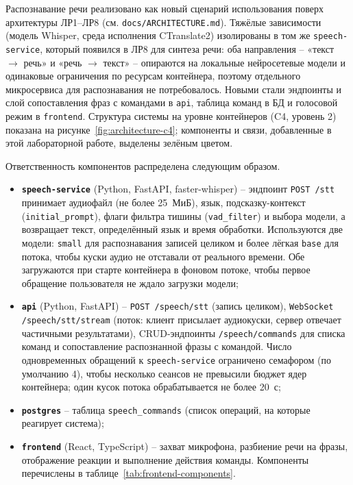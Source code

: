 

Распознавание речи реализовано как новый сценарий использования поверх
архитектуры ЛР1--ЛР8 (см. \texttt{docs/ARCHITECTURE.md}). Тяжёлые
зависимости (модель Whisper, среда исполнения CTranslate2) изолированы
в том же \texttt{speech-service}, который появился в ЛР8 для синтеза
речи: оба направления -- «текст $\to$ речь» и «речь $\to$ текст» --
опираются на локальные нейросетевые модели и одинаковые ограничения по
ресурсам контейнера, поэтому отдельного микросервиса для распознавания
не потребовалось. Новыми стали эндпоинты и слой сопоставления фраз с
командами в \texttt{api}, таблица команд в БД и голосовой режим в
\texttt{frontend}. Структура системы на уровне контейнеров (C4,
уровень 2) показана на рисунке~\ref{fig:architecture-c4}; компоненты и
связи, добавленные в этой лабораторной работе, выделены зелёным цветом.


Ответственность компонентов распределена следующим образом.
\begin{itemize}
  \item \textbf{\texttt{speech-service}} (Python, FastAPI,
  faster-whisper) -- эндпоинт \texttt{POST /stt} принимает аудиофайл
  (не более 25~МиБ), язык, подсказку-контекст (\texttt{initial\_prompt}),
  флаги фильтра тишины (\texttt{vad\_filter}) и выбора модели, а
  возвращает текст, определённый язык и время обработки. Используются
  две модели: \texttt{small} для распознавания записей целиком и более
  лёгкая \texttt{base} для потока, чтобы куски аудио не отставали от
  реального времени. Обе загружаются при старте контейнера в фоновом
  потоке, чтобы первое обращение пользователя не ждало загрузки
  модели;
  \item \textbf{\texttt{api}} (Python, FastAPI) -- \texttt{POST
  /speech/stt} (запись целиком), \texttt{WebSocket
  /speech/stt/stream} (поток: клиент присылает аудиокуски, сервер
  отвечает частичными результатами), CRUD-эндпоинты
  \texttt{/speech/commands} для списка команд и сопоставление
  распознанной фразы с командой. Число одновременных обращений к
  \texttt{speech-service} ограничено семафором (по умолчанию 4), чтобы
  несколько сеансов не превысили бюджет ядер контейнера; один кусок
  потока обрабатывается не более 20~с;
  \item \textbf{\texttt{postgres}} -- таблица \texttt{speech\_commands}
  (список операций, на которые реагирует система);
  \item \textbf{\texttt{frontend}} (React, TypeScript) -- захват
  микрофона, разбиение речи на фразы, отображение реакции и выполнение
  действия команды. Компоненты перечислены в
  таблице~\ref{tab:frontend-components}.
\end{itemize}

